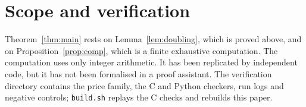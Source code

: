 \documentclass[11pt]{amsart}
\theoremstyle{definition}
\theoremstyle{remark}
\begin{document}
\section{Scope and verification}

Theorem~\ref{thm:main} rests on Lemma~\ref{lem:doubling}, which is proved above, and on Proposition~\ref{prop:comp}, which is a finite exhaustive computation. The computation uses only integer arithmetic. It has been replicated by independent code, but it has not been formalised in a proof assistant. The verification directory contains the price family, the C and Python checkers, run logs and negative controls; \texttt{build.sh} replays the C checks and rebuilds this paper.



\end{document}
